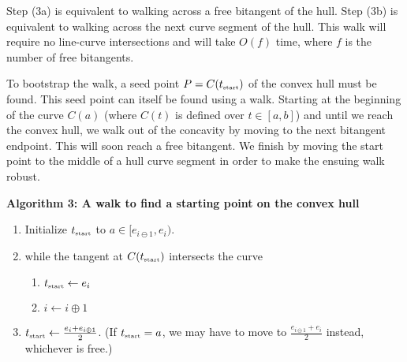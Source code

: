 \documentclass[12pt]{article}
\begin{document}
Step (3a) is equivalent to walking across a free bitangent of the hull.
Step (3b) is equivalent to walking across the next curve segment of the hull.
This walk will require no line-curve intersections
and will take $O(f)$ time, where $f$ is the number of free bitangents.

To bootstrap the walk,
a seed point $P = C(t_{\mbox{\tiny{start}}})$
of the convex hull must be found.
This seed point can itself be found using a walk.
Starting at the beginning of the curve $C(a)$
(where $C(t)$ is defined over $t \in [a,b]$)
and until we reach the convex hull, we walk out of the concavity
by moving to the next bitangent endpoint.
This will soon reach a free bitangent.
We finish by moving the start point to the middle of a hull curve segment
in order to make the ensuing walk robust.

\vspace{.2in}

\centerline{{\bf Algorithm 3: A walk to find a starting point on the convex hull}}

\begin{enumerate}
\item Initialize $t_{\mbox{\tiny{start}}}$ to $a \in [e_{i \ominus 1}, e_i)$.
\item while the tangent at $C(t_{\mbox{\tiny{start}}})$ intersects the curve
\begin{enumerate}
\item	$t_{\mbox{\tiny{start}}} \leftarrow e_{i}$
\item	$i \leftarrow i \oplus 1$
\end{enumerate}
\item $t_{\mbox{\tiny{start}}} \leftarrow \frac{e_i + e_{i \oplus 1}}{2}$.
	(If $t_{\mbox{\tiny{start}}} = a$, we may have to move to 
	$\frac{e_{i \ominus 1} + e_i}{2}$ instead, whichever is free.)
\end{enumerate}
\end{document}
